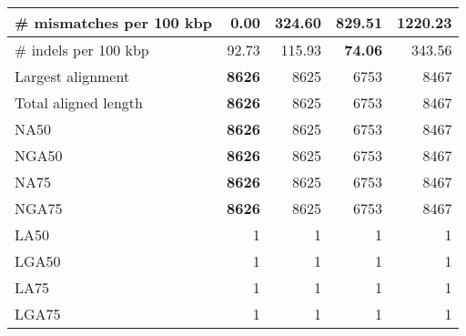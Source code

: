 \documentclass[12pt,a4paper]{article}
\begin{document}
\begin{table}[ht]
\begin{center}
\begin{tabular}{|l*{4}{|r}|}
\# mismatches per 100 kbp & {\bf 0.00} & 324.60 & 829.51 & 1220.23 \\ \hline
\# indels per 100 kbp & 92.73 & 115.93 & {\bf 74.06} & 343.56 \\ \hline
Largest alignment & {\bf 8626} & 8625 & 6753 & 8467 \\ \hline
Total aligned length & {\bf 8626} & 8625 & 6753 & 8467 \\ \hline
NA50 & {\bf 8626} & 8625 & 6753 & 8467 \\ \hline
NGA50 & {\bf 8626} & 8625 & 6753 & 8467 \\ \hline
NA75 & {\bf 8626} & 8625 & 6753 & 8467 \\ \hline
NGA75 & {\bf 8626} & 8625 & 6753 & 8467 \\ \hline
LA50 & 1 & 1 & 1 & 1 \\ \hline
LGA50 & 1 & 1 & 1 & 1 \\ \hline
LA75 & 1 & 1 & 1 & 1 \\ \hline
LGA75 & 1 & 1 & 1 & 1 \\ \hline
\end{tabular}
\end{center}
\end{table}
\end{document}
